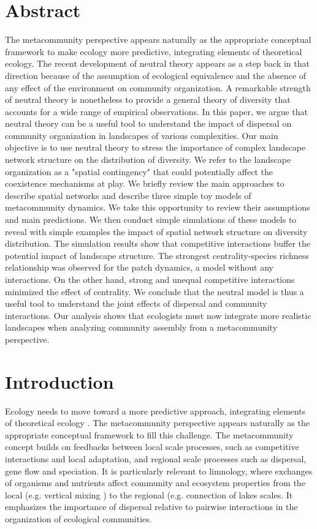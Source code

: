 \documentclass[12pt]{article}
\begin{document}
\section*{Abstract}
The metacommunity perspective appears naturally as the appropriate conceptual
framework to make ecology more predictive, integrating elements of theoretical
ecology. The recent development of neutral theory appears as a step back in that
direction because of the assumption of ecological equivalence and the absence of
any effect of the environment on community organization. A remarkable strength
of neutral theory is nonetheless to provide a general theory of diversity that
accounts for a wide range of empirical observations. In this paper, we argue
that neutral theory can be a useful tool to understand the impact of dispersal
on community organization in landscapes of various complexities. Our main
objective is to use neutral theory to stress the importance of complex landscape
network structure on the distribution of diversity. We refer to the landscape
organization as a "spatial contingency" that could potentially affect the
coexistence mechanisms at play. We briefly review the main approaches to
describe spatial networks and describe three simple toy models of metacommunity
dynamics. We take this opportunity to review their assumptions and main
predictions. We then conduct simple simulations of these models to reveal with
simple examples the impact of spatial network structure on diversity
distribution. The simulation results show that competitive interactions buffer
the potential impact of landscape structure. The strongest centrality-species
richness relationship was observed for the patch dynamics, a model without any
interactions. On the other hand, strong and unequal competitive interactions
minimized the effect of centrality. We conclude that the neutral model is thus a
useful tool to understand the joint effects of dispersal and community
interactions. Our analysis shows that ecologists must now integrate more
realistic landscapes when analyzing community assembly from a metacommunity
perspective.
\newpage

\section*{Introduction}

Ecology needs to move toward a more predictive approach, integrating elements of
theoretical ecology \parencite{Thuiller2013}. The metacommunity perspective
\parencite{Leibold2004a} appears naturally as the appropriate conceptual
framework to fill this challenge. The metacommunity concept builds on feedbacks
between local scale processes, such as competitive interactions and local
adaptation, and regional scale processes such as dispersal, gene flow and
speciation. It is particularly relevant to limnology, where exchanges of
organisms and nutrients affect community and ecosystem properties from the local
(e.g. vertical mixing \parencite{Ryabov2011}) to the regional (e.g. connection
of lakes \parencite{Leibold2004b, Gravel2010a} scales. It emphasizes the
importance of dispersal relative to pairwise interactions in the organization of
ecological communities.
\end{document}

